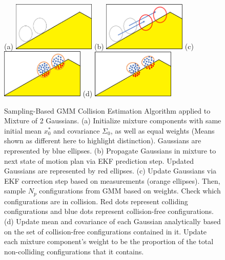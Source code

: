 \documentclass[journal]{IEEEtran}
\begin{document}
\begin{figure}[!t]
\centering
\subfloat (a) {\includegraphics[width=1.55in]{step1.png}%
\label{step_one}}
\hfil
\subfloat (b) {\includegraphics[width=1.55in]{step2.png}%
\label{step_two}}
\hfil
\subfloat (c) {\includegraphics[width=1.55in]{step3.png}%
\label{step_three}}
\hfil
\subfloat (d) {\includegraphics[width=1.55in]{step4.png}%
\label{step_four}}
\caption{Sampling-Based GMM Collision Estimation Algorithm applied to Mixture of 2 Gaussians. (a) Initialize mixture components with same initial mean $x_0^*$ and covariance $\Sigma_0$, as well as equal weights (Means shown as different here to highlight distinction). Gaussians are represented by blue ellipses. (b) Propagate Gaussians in mixture to next state of motion plan via EKF prediction step. Updated Gaussians are represented by red ellipses. (c) Update Gaussians via EKF correction step based on measurements (orange ellipses). Then, sample $N_p$ configurations from GMM based on weights. Check which configurations are in collision. Red dots represent colliding configurations and blue dots represent collision-free configurations. (d) Update mean and covariance of each Gaussian analytically based on the set of collision-free configurations contained in it. Update each mixture component's weight to be the proportion of the total non-colliding configurations that it contains.}
\label{algorithm_steps}
\end{figure}
\end{document}
